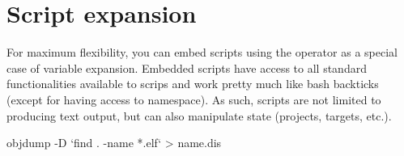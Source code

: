 %
%
%
%
%
%

\section{Script expansion}

For maximum flexibility, you can embed scripts using the \codeline{[[ ]]} operator as a special case of variable expansion. Embedded scripts have access to all standard functionalities available to scrips and work pretty much like bash backticks (except for having access to \codeblocks namespace). As such, scripts are not limited to producing text output, but can also manipulate \codeblocks state (projects, targets, etc.).



\begin{cmd}
objdump -D `find . -name *.elf` > name.dis
\end{cmd}

